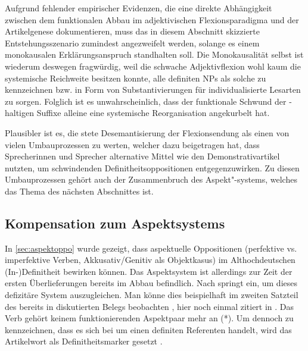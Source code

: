 Aufgrund fehlender empirischer Evidenzen, die eine direkte Abhängigkeit zwischen dem funktionalen Abbau im adjektivischen Flexionsparadigma und der Artikelgenese dokumentieren, muss das in diesem Abschnitt skizzierte Entstehungsszenario  zumindest angezweifelt werden, solange es einem monokausalen Erklärungsanspruch standhalten soll. Die Monokausalität selbst ist wiederum deswegen fragwürdig, weil  die schwache Adjektivflexion wohl kaum die systemische Reichweite besitzen konnte,  alle definiten NPs als solche zu kennzeichnen bzw. in Form von Substantivierungen  für individualisierte Lesarten zu sorgen. Folglich ist es unwahrscheinlich, dass der funktionale Schwund der -haltigen Suffixe alleine eine systemische Reorganisation angekurbelt hat. 

Plausibler ist es, die stete Desemantisierung der Flexionsendung als einen von vielen Umbauprozessen zu werten, welcher dazu beigetragen hat, dass Sprecherinnen und Sprecher alternative Mittel wie den Demonstrativartikel nutzten, um schwindenden Definitheitsoppositionen entgegenzuwirken. Zu diesen Umbauprozessen gehört auch der Zusammenbruch des Aspekt"-systems, welches das Thema des nächsten Abschnittes ist.

\subsection{Kompensation zum Aspektsystems} \label{aspekt}

In \ref{sec:aspektoppo} wurde gezeigt, dass aspektuelle Oppositionen (perfektive vs. imperfektive Verben, Akkusativ/Genitiv als Objektkasus) im Althochdeutschen (In-)De\-fi\-nit\-heit bewirken können. Das Aspektsystem ist allerdings zur Zeit der ersten Überlieferungen bereits im Abbau befindlich. Nach  \textcite{Leiss1994,Leiss2000,Leiss2010} springt  ein, um dieses defizitäre System auszugleichen. Man könne dies beispielhaft im zweiten Satzteil des bereits in  diskutierten Belegs beobachten \parencite[180f.]{Leiss2000}, hier noch einmal zitiert in . Das Verb  gehört keinem funktionierenden Aspektpaar mehr an (*). Um dennoch zu kennzeichnen, dass es sich bei  um einen definiten Referenten handelt, wird das Artikelwort  als Definitheitsmarker gesetzt \parencite[181]{Leiss2000}.


